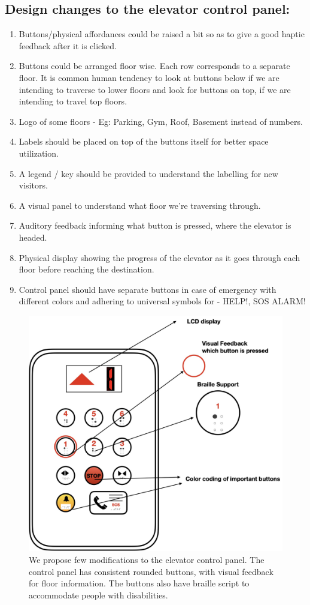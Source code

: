 \documentclass[10pt]{scrartcl}
\begin{document}
\subsection{Design changes to the elevator control panel:}

\begin{enumerate}
	\item Buttons/physical affordances could be raised a bit so as to give a good haptic feedback after it is clicked.
	\item Buttons could be arranged floor wise. Each row corresponds to a separate floor. It is common human tendency to look at buttons below if we are intending to traverse to lower floors and look for buttons on top, if we are intending to travel top floors.
	\item Logo of some floors - Eg: Parking, Gym, Roof, Basement instead of numbers.
	\item Labels should be placed on top of the buttons itself for better space utilization.
	\item A legend / key should be provided to understand the labelling for new visitors.
	\item A visual panel to understand what floor we’re traversing through. 
	\item Auditory feedback informing what button is pressed, where the elevator is headed.
	\item Physical display showing the progress of the elevator as it goes through each floor before reaching the destination.
	\item Control panel should have separate buttons in case of emergency with different colors and adhering to universal symbols for - HELP!, SOS ALARM!
	\end{enumerate}

\begin{figure}
	\centering
	\includegraphics[width=0.3\linewidth]{revamp}
	\caption{We propose few modifications to the elevator control panel. The control panel has consistent rounded buttons, with visual feedback for floor information. The buttons also have braille script to accommodate people with disabilities.}
	\label{fig:revamp}
\end{figure}
\end{document}
